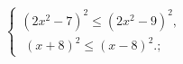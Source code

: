 \begin{ex}[type=ineq_system]
	\begin{condition}
		$\begin{cases}(2x^2 - 7)^2\leqslant(2x^2 - 9)^2  ,\\
			\; (x + 8)^2\leqslant(x - 8)^2 .;
		\end{cases}$
	\end{condition}
\end{ex}